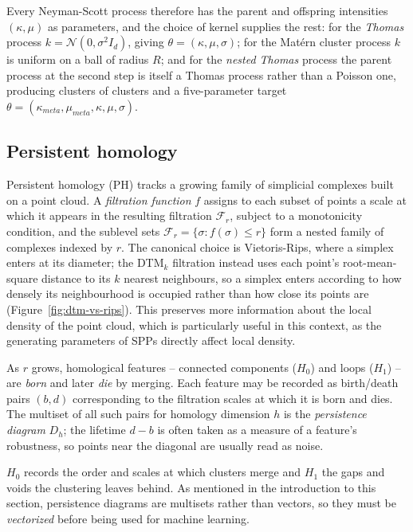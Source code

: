 \documentclass[11pt,a4paper]{article}
\newcommand{\filt}{\mathcal{F}}
\begin{document}
Every Neyman-Scott process therefore has the parent and offspring intensities
$(\kappa,\mu)$ as parameters, and the choice of kernel supplies the rest: for
the \emph{Thomas} process $k = \mathcal{N}(0,\sigma^2 I_d)$, giving
$\theta = (\kappa,\mu,\sigma)$; for the Mat\'ern cluster process $k$ is uniform
on a ball of radius $R$; and for the \emph{nested Thomas} process the parent
process at the second step is itself a Thomas process rather than a Poisson one,
producing clusters of clusters and a five-parameter target $\theta = (\kappa_{meta},\mu_{meta},\kappa,\mu, \sigma)$.

\subsection{Persistent homology}
\label{ssec:persistence}
Persistent homology (PH)  tracks a growing family of simplicial complexes built on a point cloud. A
\emph{filtration function} $f$ assigns to each subset of points a scale at
which it appears in the resulting filtration $\filt_r$, subject to a monotonicity condition, and the sublevel sets
$\filt_r = \{\sigma : f(\sigma)\le r\}$ form a nested family of complexes
indexed by $r$. The canonical choice is Vietoris-Rips, where a simplex enters at
its diameter; the DTM$_k$ filtration \citep{anai2020dtm} instead uses each
point's root-mean-square distance to its $k$ nearest neighbours, so a simplex
enters according to how densely its neighbourhood is occupied rather than how
close its points are (Figure~\ref{fig:dtm-vs-rips}). This preserves more information about the local density of the point cloud, which is particularly useful in this context, as the generating parameters of SPPs directly affect local density.

As $r$ grows, homological features -- connected components ($H_0$) and loops
($H_1$) -- are \emph{born} and later \emph{die}
by merging. Each feature may be recorded as birth/death pairs $(b,d)$ corresponding to the filtration scales at which it is born and dies. The multiset of all such pairs for homology dimension $h$ is the
\emph{persistence diagram} $D_h$; the lifetime $d-b$ is often taken as a measure of a feature's robustness, so points near the diagonal are usually read as noise. 

$H_0$ records the order and scales at which clusters merge and $H_1$ the gaps and voids the clustering leaves behind. As mentioned in the introduction to this section, persistence diagrams are multisets rather than vectors, so they must be \emph{vectorized}
before being used for machine learning.
\end{document}
